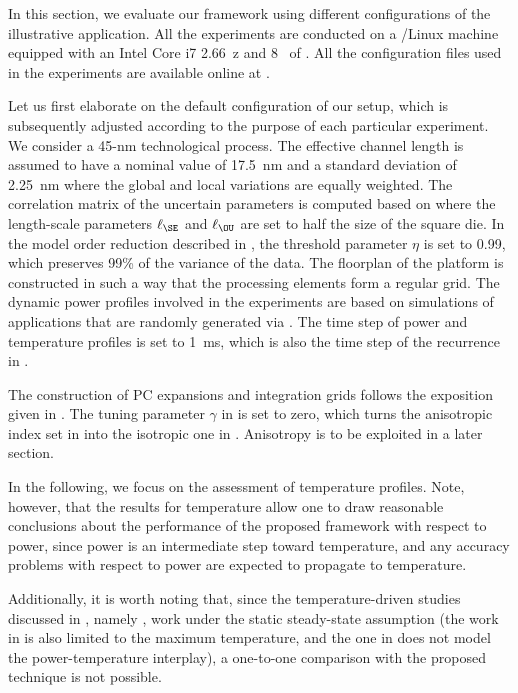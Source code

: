 In this section, we evaluate our framework using different configurations of the
illustrative application. All the experiments are conducted on a /Linux
machine equipped with an Intel Core i7 2.66~z and 8~ of .
All the configuration files used in the experiments are available online at
\cite{eslab2014b}.

Let us first elaborate on the default configuration of our setup, which is
subsequently adjusted according to the purpose of each particular experiment. We
consider a 45-nm technological process. The effective channel length is assumed
to have a nominal value of 17.5~nm \cite{ptm} and a standard deviation of
2.25~nm where the global and local variations are equally weighted. The
correlation matrix of the uncertain parameters is computed based on
 where the length-scale parameters $\ell_\SE$ and
$\ell_\OU$ are set to half the size of the square die. In the model order
reduction described in , the threshold
parameter $\eta$ is set to 0.99, which preserves 99\% of the variance of the
data. The floorplan of the platform is constructed in such a way that the
processing elements form a regular grid. The dynamic power profiles involved in
the experiments are based on simulations of applications that are randomly
generated via  \cite{dick1998}. The time step \dt of power and
temperature profiles is set to 1~ms, which is also the time step of the
recurrence in .

The construction of \ac{PC} expansions and integration grids follows the
exposition given in . The tuning parameter $\gamma$ in
 is set to zero, which turns the anisotropic
index set in  into the isotropic one in
. Anisotropy is to be exploited in a later
section.

In the following, we focus on the assessment of temperature profiles. Note,
however, that the results for temperature allow one to draw reasonable
conclusions about the performance of the proposed framework with respect to
power, since power is an intermediate step toward temperature, and any accuracy
problems with respect to power are expected to propagate to temperature.

Additionally, it is worth noting that, since the temperature-driven studies
discussed in , namely \cite{huang2009a, juan2011, juan2012,
lee2013}, work under the static steady-state assumption (the work in
\cite{juan2011} is also limited to the maximum temperature, and the one in
\cite{huang2009a} does not model the power-temperature interplay), a one-to-one
comparison with the proposed technique is not possible.

